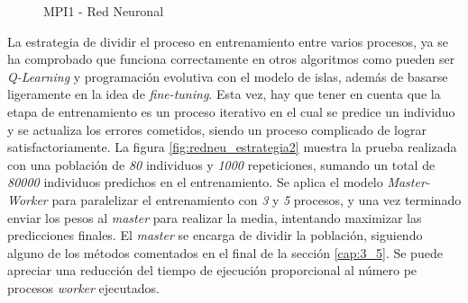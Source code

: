 			\begin{figure}[!h]
				\centering
				\caption{MPI1 - Red Neuronal}
				\label{fig:redneu_estrategia1}
			\end{figure}

			
			

			La estrategia de dividir el proceso en entrenamiento entre varios procesos, ya se ha comprobado que funciona correctamente en otros algoritmos como pueden ser \textit{Q-Learning} y programación evolutiva con el modelo de islas, además de basarse ligeramente en la idea de \textit{fine-tuning}. Esta vez, hay que tener en cuenta que la etapa de entrenamiento es un proceso iterativo en el cual se predice un individuo y se actualiza los errores cometidos, siendo un proceso complicado de lograr satisfactoriamente. La figura \ref{fig:redneu_estrategia2} muestra la prueba realizada con una población de \textit{80} individuos y \textit{1000} repeticiones, sumando un total de \textit{80000} individuos predichos en el entrenamiento. Se aplica el modelo \textit{Master-Worker} para paralelizar el entrenamiento con \textit{3} y \textit{5} procesos, y una vez terminado enviar los pesos al \textit{master} para realizar la media, intentando maximizar las predicciones finales. El \textit{master} se encarga de dividir la población, siguiendo alguno de los métodos comentados en el final de la sección \ref{cap:3_5}. Se puede apreciar una reducción del tiempo de ejecución proporcional al número pe procesos \textit{worker} ejecutados.
		
